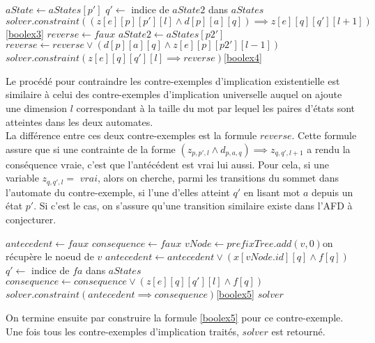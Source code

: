 \documentclass[12pt,a4paper,oneside,titlepage]{report}
\begin{document}
\begin{algorithm}[H]
\begin{algorithmic}[1]
			\State $aState\gets aStates[p']$
						\State $q'\gets$ indice de $aState2$ dans $aStates$
							\State $solver.constraint((z[e][p][p'][l]\land d[p][a][q])\implies z[e][q][q'][l+1])$\Comment\ref{boolex3}
						\EndFor
					\EndFor
				\EndFor
			\EndFor
					\State $reverse\gets faux$
						\State $aState2\gets aStates[p2']$
								\State $reverse\gets reverse \lor(d[p][a][q]\land z[e][p][p2'][l-1])$
							\EndFor
						\EndFor
					\EndFor
					\State $solver.constraint(z[e][q][q'][l]\implies reverse)$\Comment\ref{boolex4}
				\EndFor
			\EndFor
		\EndFor
{}
\end{algorithmic}
\end{algorithm}
\noindent Le procédé pour contraindre les contre-exemples d'implication existentielle est similaire à celui des contre-exemples d'implication universelle auquel on ajoute une dimension $l$ correspondant à la taille du mot par lequel les paires d'états sont atteintes dans les deux automates.\\
La différence entre ces deux contre-exemples est la formule $reverse$. Cette formule assure que si une contrainte de la forme $(z_{p,p',l}\land d_{p,a,q}) \implies z_{q,q',l+1}$ a rendu la conséquence vraie, c'est que l'antécédent est vrai lui aussi. Pour cela, si une variable $z_{q,q',l}=$ $vrai$, alors on cherche, parmi les transitions du sommet dans l'automate du contre-exemple, si l'une d'elles atteint $q'$ en lisant mot $a$ depuis un état $p'$. Si c'est le cas, on s'assure qu'une transition similaire existe dans l'AFD à conjecturer.
\begin{algorithm}[H]
\begin{algorithmic}[1]
		\State $antecedent\gets faux$
		\State $consequence\gets faux$
		\State $vNode\gets prefixTree.add(v,0)$\Comment on récupère le noeud de $v$
			\State $antecedent\gets antecedent\lor(x[vNode.id][q]\land f[q])$
				\State $q'\gets$ indice de $fa$ dans $aStates$
					\State $consequence\gets consequence\lor (z[e][q][q'][l]\land f[q])$
				\EndFor
			\EndFor
		\EndFor
		\State $solver.constraint(antecedent\implies consequence)$\Comment\ref{boolex5}
	\EndFor
\EndIf
\State\Return $solver$
\end{algorithmic}
\end{algorithm}
\noindent On termine ensuite par construire la formule \ref{boolex5} pour ce contre-exemple.\\
\noindent Une fois tous les contre-exemples d'implication traités, $solver$ est retourné.\\
\end{document}
